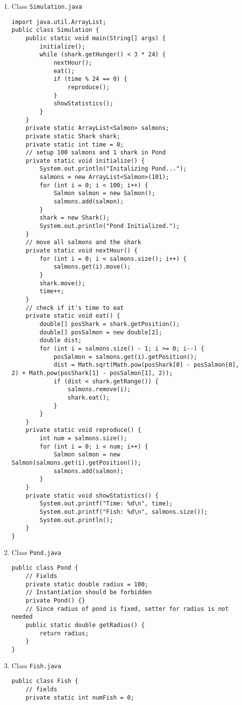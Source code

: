 \documentclass[12pt,letterpaper,twoside]{article}
\begin{document}
\begin{enumerate}
\item Class \texttt{Simulation.java}
\lstset{language=java, tabsize=2}
\begin{lstlisting}
import java.util.ArrayList;
public class Simulation {
	public static void main(String[] args) {
		initialize();
		while (shark.getHunger() < 3 * 24) {
			nextHour();
			eat();
			if (time % 24 == 0) {
				reproduce();
			}
			showStatistics();
		}
	}
	private static ArrayList<Salmon> salmons;
	private static Shark shark;
	private static int time = 0;
	// setup 100 salmons and 1 shark in Pond
	private static void initialize() {
		System.out.println("Initalizing Pond...");
		salmons = new ArrayList<Salmon>(101);
		for (int i = 0; i < 100; i++) {
			Salmon salmon = new Salmon();
			salmons.add(salmon);
		}
		shark = new Shark();
		System.out.println("Pond Initialized.");
	}
	// move all salmons and the shark
	private static void nextHour() {
		for (int i = 0; i < salmons.size(); i++) {
			salmons.get(i).move();
		}
		shark.move();
		time++;
	}
	// check if it's time to eat
	private static void eat() {
		double[] posShark = shark.getPosition();
		double[] posSalmon = new double[2];
		double dist;
		for (int i = salmons.size() - 1; i >= 0; i--) {
			posSalmon = salmons.get(i).getPosition();
			dist = Math.sqrt(Math.pow(posShark[0] - posSalmon[0], 2) + Math.pow(posShark[1] - posSalmon[1], 2));
			if (dist < shark.getRange()) {
				salmons.remove(i);
				shark.eat();
			}
		}
	}
	private static void reproduce() {
		int num = salmons.size();
		for (int i = 0; i < num; i++) {
			Salmon salmon = new Salmon(salmons.get(i).getPosition());
			salmons.add(salmon);
		}
	}
	private static void showStatistics() {
		System.out.printf("Time: %d\n", time);
		System.out.printf("Fish: %d\n", salmons.size());
		System.out.println();
	}
}
\end{lstlisting}
\item Class \texttt{Pond.java}
\lstset{language=java, tabsize=2}
\begin{lstlisting}
public class Pond {
	// Fields
	private static double radius = 100;
	// Instantiation should be forbidden
	private Pond() {}
	// Since radius of pond is fixed, setter for radius is not needed
	public static double getRadius() {
		return radius;
	}
}
\end{lstlisting}
\item Class \texttt{Fish.java}
\lstset{language=java, tabsize=2}
\begin{lstlisting}
public class Fish {
	// fields
	private static int numFish = 0;

\end{lstlisting}
\end{enumerate}
\end{document}
